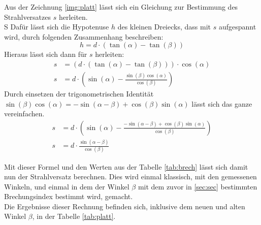\noindent Aus der Zeichnung \ref{img:platt} lässt sich ein Gleichung zur Bestimmung des Strahlversatzes $s$ herleiten.\\S
Dafür lässt sich die Hypotenuse $h$ des kleinen Dreiecks, dass mit $s$ aufgespannt wird, durch folgenden Zusammenhang beschreiben:
\begin{equation*}
    h=d\cdot \left( \tan(\alpha)-\tan(\beta)   \right)
\end{equation*}
Hieraus lässt sich dann für $s$ herleiten:
\begin{align*}
    s&=\left( d\cdot \left( \tan(\alpha)-\tan(\beta)   \right) \right) \cdot \cos(\alpha)\\
    s&=d \cdot \left(\sin(\alpha) - \frac{\sin(\beta) \cos(\alpha)}{\cos(\beta)} \right)
\end{align*}
Durch einsetzen der trigonometrischen Identität $\sin(\beta) \cos(\alpha)= -\sin(\alpha-\beta)+\cos(\beta)\sin(\alpha)$ lässt sich das ganze vereinfachen.
\begin{align*}
    s&=d \cdot \left(\sin(\alpha) - \frac{-\sin(\alpha-\beta)+\cos(\beta)\sin(\alpha)}{\cos(\beta)} \right)\\
    s&= d\cdot \frac{\sin(\alpha-\beta)}{\cos(\beta)}
\end{align*}


\noindent Mit dieser Formel und den Werten aus der Tabelle \ref{tab:brech} 
lässt sich damit nun der Strahlversatz berechnen.
Dies wird einmal klassisch, mit den gemessenen Winkeln, und einmal in dem der Winkel $\beta$ mit dem zuvor in \ref{sec:sec} bestimmten Brechungsindex bestimmt wird, gemacht.\\
Die Ergebnisse dieser Rechnung befinden sich, inklusive dem neuen und alten Winkel $\beta$, in der Tabelle \ref{tab:platt}.\\\\

